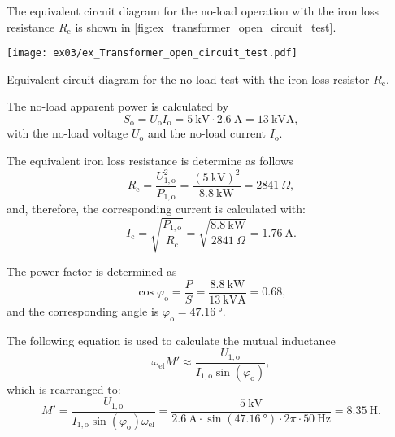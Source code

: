 \begin{solutionblock}

  The equivalent circuit diagram for the no-load operation with the iron loss resistance $R_{\mathrm{c}}$ is shown in \autoref{fig:ex_transformer_open_circuit_test}.
  \begin{solutionfigure}[h!]
    \centering
    \texttt{[image: ex03/ex\_Transformer\_open\_circuit\_test.pdf]}
    \caption{Equivalent circuit diagram for the no-load test with the iron loss resistor $R_{\mathrm{c}}$.}
    \label{fig:ex_transformer_open_circuit_test}
  \end{solutionfigure}
  
  
  The no-load apparent power is calculated by
  \begin{equation}
    S_{\mathrm{o}} = U_{\mathrm{o}} I_{\mathrm{o}}
    = \SI{5}{\kilo\volt} \cdot \SI{2.6}{\ampere}
    = \SI{13}{\kilo\volt\ampere},
  \end{equation}
  with the no-load voltage $U_{\mathrm{o}}$ and the no-load current $I_{\mathrm{o}}$.

  The equivalent iron loss resistance is determine as follows
  \begin{equation}
    R_{\mathrm{c}} = \frac{U_{\mathrm{1,o}}^2}{P_{\mathrm{1,o}}}
    = \frac{\left(\SI{5}{\kilo\volt} \right)^2}{\SI{8.8}{\kilo\watt}}
    = \SI{2841}{\Omega},
  \end{equation}
  and, therefore, the corresponding current is calculated with:
  \begin{equation}
    I_{\mathrm{c}} = \sqrt{\frac{P_{\mathrm{1,o}}}{R_{\mathrm{c}}}}
    = \sqrt{\frac{\SI{8.8}{\kilo\watt}}{\SI{2841}{\Omega}}}
    = \SI{1.76}{\ampere}.
  \end{equation}

  The power factor is determined as
  \begin{equation}
    \cos \varphi_{\mathrm{o}} = \frac{P}{S}
    = \frac{\SI{8.8}{\kilo\watt}}{\SI{13}{\kilo\volt\ampere}}
    = 0.68,
  \end{equation}
  and the corresponding angle is $\varphi_{\mathrm{o}} = \SI{47.16}{\degree}$.

  The following equation is used to calculate the mutual inductance
  \begin{equation}
    \omega_{\mathrm{el}} M' \approx \frac{U_{\mathrm{1,o}}}{I_{\mathrm{1,o}} \sin(\varphi_{\mathrm{o}})},
  \end{equation}
  which is rearranged to:
  \begin{equation}
    M' = \frac{U_{\mathrm{1,o}}}{I_{\mathrm{1,o}} \sin(\varphi_{\mathrm{o}}) \omega_{\mathrm{el}}}
    = \frac{\SI{5}{\kilo\volt}}{\SI{2.6}{\ampere}\cdot \sin(\SI{47.16}{\degree})\cdot 2\pi \cdot \SI{50}{\hertz}}
    = \SI{8.35}{\henry}.
  \end{equation}


\end{solutionblock}
